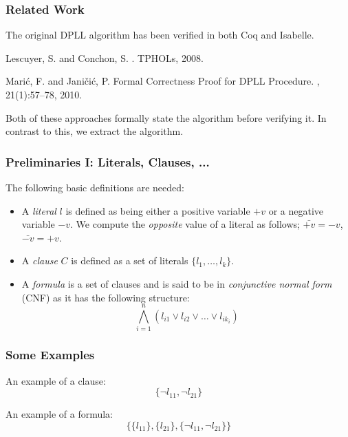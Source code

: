 \documentclass{beamer}
\begin{document}
\begin{frame}
  \frametitle{Related Work}    

The original DPLL algorithm has been verified in both Coq and Isabelle. \\

\medskip

  \begin{thebibliography}{10}    
  \beamertemplatearticlebibitems
    Lescuyer, S. and Conchon, S.
    .
    \newblock TPHOLs, 2008.

    Mari\'{c}, F. and Jani\v{c}i\'{c}, P.
    \newblock Formal Correctness Proof for {DPLL} Procedure.
    , 21(1):57--78, 2010.
  \end{thebibliography}

\medskip

Both of these approaches formally state the algorithm before verifying it. In contrast to this, we extract the algorithm.

\end{frame}

\begin{frame}
\frametitle{Preliminaries I: Literals, Clauses, ...}

The following basic definitions are needed:

\begin{itemize}
\item A \emph{literal} $l$ is defined as being either a positive variable $+v$ or a negative variable $-v$.  We compute the \emph{opposite} value of a literal as follows; $\bar{+v}= -v$, $\bar{-v} = +v$.
\medskip
\item A \emph{clause} $C$ is defined as a set of literals $\{ l_1, \ldots , l_k \}$.
\medskip
\item A \emph{formula} is a set of clauses and is said to be in \emph{conjunctive normal form} (CNF) as it has the following structure: $$\bigwedge^n_{i=1}(l_{i1} \vee l_{i2} \vee \ldots \vee l_{ik_i})$$  

\end{itemize}

\end{frame}

\begin{frame}
\frametitle{Some Examples}
An example of a clause:
$$ \{ \neg l_{11} , \neg l_{21} \} $$

An example of a formula:
$$ \{ \{ l_{11} \}, \{l_{21} \}, \{ \neg l_{11} , \neg l_{21} \} \}$$

\end{frame}
\end{document}

